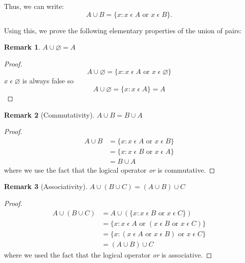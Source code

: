\documentclass[12pt]{article}
\newtheorem{remark}{Remark}
\begin{document}
Thus, we can write:
\begin{equation}
    A \cup B = \{x: x\;\epsilon\;A \text{ or } x\;\epsilon\;B\}.
\end{equation}

Using this, we prove the following elementary properties of the union of pairs:
\begin{remark}
    $A \cup\varnothing = A$
\end{remark}
\begin{proof}
    \begin{displaymath}
        A \cup \varnothing = \{x: x\;\epsilon\;A \text{ or } x\;\epsilon\;\varnothing\}
    \end{displaymath}
    $x\;\epsilon\;\varnothing$ is always false so
    \begin{displaymath}
        A \cup \varnothing = \{x: x\;\epsilon\;A\} = A
    \end{displaymath}
\end{proof}

\begin{remark}[Commutativity]
    $A \cup B = B \cup A$
\end{remark}
\begin{proof}
    \begin{align*}
        A \cup B &= \{x: x\;\epsilon\;A \text{ or } x\;\epsilon\;B\}\\
                 &= \{x: x\;\epsilon\;B \text{ or } x\;\epsilon\;A\}\\
                 &= B \cup A
    \end{align*}
    where we use the fact that the logical operator \textit{or} is commutative.
\end{proof}

\begin{remark}[Associativity]
    $A \cup (B \cup C) = (A \cup B) \cup C$
\end{remark}
\begin{proof}
    \begin{align*}
        A \cup (B \cup C) &= A \cup (\{x: x\;\epsilon\;B \text{ or } x\;\epsilon\;C\})\\
                          &= \{x: x\;\epsilon\;A \text{ or } (x\;\epsilon\;B \text{ or } x\;\epsilon\;C)\}\\
                          &= \{x: (x\;\epsilon\;A \text{ or } x\;\epsilon\;B) \text{ or } x\;\epsilon\;C\}\\
                          &= (A \cup B) \cup C
    \end{align*}
    where we used the fact that the logical operator \textit{or} is associative.
\end{proof}
\end{document}
